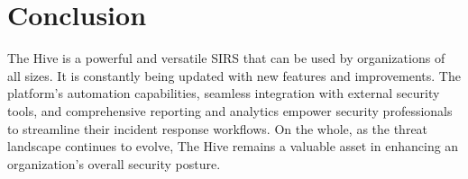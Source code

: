 \documentclass{book}
\begin{document}
\chapter{Conclusion}
The Hive is a powerful and versatile SIRS that can be used by organizations of all sizes. It is constantly being updated with new features and improvements. The platform’s automation capabilities, seamless integration with external security tools,
and comprehensive reporting and analytics empower security professionals to streamline their incident
response workflows. On the whole, as the threat landscape continues to evolve, The Hive remains a
valuable asset in enhancing an organization’s overall security posture.
\end{document}
